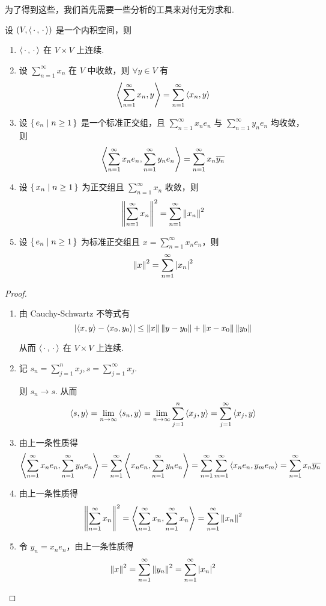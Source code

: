 为了得到这些，我们首先需要一些分析的工具来对付无穷求和.


\begin{property}
    设 $(V,\left\langle{\,\cdot\,,\,\cdot\,}\right\rangle)$ 是一个内积空间，则

    \begin{enumerate}
        \item $\left\langle{\,\cdot\,,\,\cdot\,}\right\rangle$ 在 $V\times V$ 上连续.
        
        \item 设 $\sum\limits_{n=1}^\infty x_n$ 在 $V$ 中收敛，则 $\forall y\in V$ 有
$$
\left\langle{\sum_{n=1}^\infty x_n,y}\right\rangle=\sum_{n=1}^\infty\left\langle{x_n,y}\right\rangle
$$

        \item 设 $\set{e_n|n\ge 1}$ 是一个标准正交组，且 $\sum\limits_{n=1}^\infty x_ne_n$ 与 $\sum\limits_{n=1}^\infty y_ne_n$ 均收敛，则
$$
\left\langle{\sum_{n=1}^\infty x_ne_n,\sum_{n=1}^\infty y_ne_n}\right\rangle=\sum_{n=1}^\infty x_n\overline{y_n}
$$

        \item 设 $\set{x_n|n\ge 1}$ 为正交组且 $\sum\limits_{n=1}^\infty x_n$ 收敛，则
$$
\left\lVert{\sum_{n=1}^\infty x_n}\right\rVert^2=\sum_{n=1}^\infty\left\lVert{x_n}\right\rVert^2
$$

        \item 设 $\set{e_n|n\ge 1}$ 为标准正交组且 $x=\sum\limits_{n=1}^\infty x_ne_n$，则
$$
\left\lVert{x}\right\rVert^2=\sum_{n=1}^\infty\left\lvert{x_n}\right\rvert^2
$$
    \end{enumerate}
\end{property}
\begin{proof}
    \begin{enumerate}
        \item 由 Cauchy-Schwartz 不等式有
$$
\left\lvert{\left\langle{x,y}\right\rangle-\left\langle{x_0,y_0}\right\rangle}\right\rvert\le\left\lVert{x}\right\rVert\left\lVert{y-y_0}\right\rVert+\left\lVert{x-x_0}\right\rVert\left\lVert{y_0}\right\rVert
$$

        从而 $\left\langle{\,\cdot\,,\,\cdot\,}\right\rangle$ 在 $V\times V$ 上连续.

        \item 记 $s_n=\sum\limits_{j=1}^nx_j,s=\sum\limits_{j=1}^\infty x_j$.
        
        则 $s_n\to s$. 从而
$$
\left\langle{s,y}\right\rangle=\lim_{n\to\infty}\left\langle{s_n,y}\right\rangle=\lim_{n\to\infty}\sum_{j=1}^n\left\langle{x_j,y}\right\rangle=\sum_{j=1}^\infty\left\langle{x_j,y}\right\rangle
$$

        \item 由上一条性质得
$$
\left\langle{\sum_{n=1}^\infty x_ne_n,\sum_{n=1}^\infty y_ne_n}\right\rangle=\sum_{n=1}^\infty\left\langle{x_ne_n,\sum_{n=1}^\infty y_ne_n}\right\rangle=\sum_{n=1}^\infty\sum_{m=1}^\infty\left\langle{x_ne_n,y_me_m}\right\rangle=\sum_{n=1}^\infty x_n\overline{y_n}
$$
        
        \item 由上一条性质得
$$
\left\lVert{\sum_{n=1}^\infty x_n}\right\rVert^2=\left\langle{\sum_{n=1}^\infty x_n,\sum_{n=1}^\infty x_n}\right\rangle=\sum_{n=1}^\infty\left\lVert{x_n}\right\rVert^2
$$

        \item 令 $y_n=x_ne_n$，由上一条性质得
$$
\left\lVert{x}\right\rVert^2=\sum_{n=1}^\infty\left\lVert{y_n}\right\rVert^2=\sum_{n=1}^\infty\left\lvert{x_n}\right\rvert^2
$$
    \end{enumerate}
\end{proof}